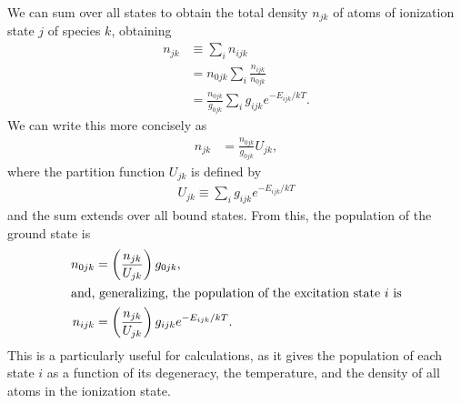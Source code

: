 We can sum over all states to obtain the total density
$n_{jk}$ of atoms of ionization state $j$ of species $k$, obtaining
\begin{align}
n_{jk} &\equiv \sum_i n_{ijk}\\
&=n_{0jk} \sum_i \frac{n_{ijk}}{n_{0jk}}\\
&= \frac{n_{0jk}}{g_{0jk}} \sum_i g_{ijk} e^{-E_{ijk}/kT}.
\end{align}
We can write this more concisely as
\begin{align}
n_{jk} &= \frac{n_{0jk}}{g_{0jk}} U_{jk},
\end{align}
where the partition function $U_{jk}$ is defined by
\begin{align}
U_{jk} \equiv \sum_i g_{ijk} e^{-E_{ijk}/kT}
\end{align}
and the sum extends over all bound states. From this, the
population of the ground state is
\begin{align}
n_{0jk} &= \left(\frac{n_{jk}}{U_{jk}}\right) g_{0jk},\\
\intertext{and, generalizing, the population of the excitation state $i$ is}
n_{ijk} &= \left(\frac{n_{jk}}{U_{jk}}\right) g_{ijk} e^{-E_{ijk}/kT}.
\eqlabel{boltzmann-n-ijk}
\end{align}
This is a particularly useful for calculations, as it gives the
population of each state $i$ as a function of its degeneracy, the
temperature, and the density of all atoms in the ionization state.

\newslide

